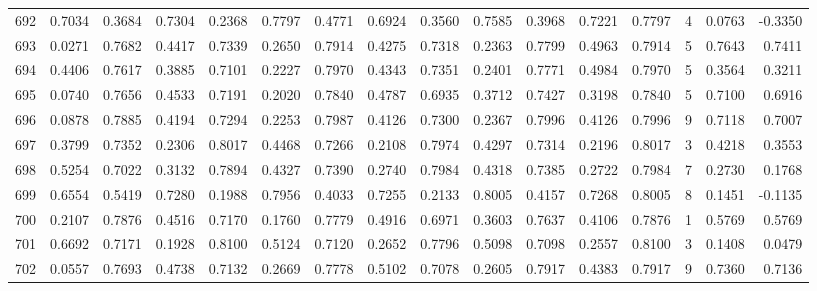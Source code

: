 \begin{tabular}{lrrrrrrrrrrrrrrr}
692 &      0.7034 &  0.3684 &  0.7304 &  0.2368 &  0.7797 &  0.4771 &  0.6924 &  0.3560 &  0.7585 &  0.3968 &   0.7221 &     0.7797 &      4 &                    0.0763 &                    -0.3350 \\
693 &      0.0271 &  0.7682 &  0.4417 &  0.7339 &  0.2650 &  0.7914 &  0.4275 &  0.7318 &  0.2363 &  0.7799 &   0.4963 &     0.7914 &      5 &                    0.7643 &                     0.7411 \\
694 &      0.4406 &  0.7617 &  0.3885 &  0.7101 &  0.2227 &  0.7970 &  0.4343 &  0.7351 &  0.2401 &  0.7771 &   0.4984 &     0.7970 &      5 &                    0.3564 &                     0.3211 \\
695 &      0.0740 &  0.7656 &  0.4533 &  0.7191 &  0.2020 &  0.7840 &  0.4787 &  0.6935 &  0.3712 &  0.7427 &   0.3198 &     0.7840 &      5 &                    0.7100 &                     0.6916 \\
696 &      0.0878 &  0.7885 &  0.4194 &  0.7294 &  0.2253 &  0.7987 &  0.4126 &  0.7300 &  0.2367 &  0.7996 &   0.4126 &     0.7996 &      9 &                    0.7118 &                     0.7007 \\
697 &      0.3799 &  0.7352 &  0.2306 &  0.8017 &  0.4468 &  0.7266 &  0.2108 &  0.7974 &  0.4297 &  0.7314 &   0.2196 &     0.8017 &      3 &                    0.4218 &                     0.3553 \\
698 &      0.5254 &  0.7022 &  0.3132 &  0.7894 &  0.4327 &  0.7390 &  0.2740 &  0.7984 &  0.4318 &  0.7385 &   0.2722 &     0.7984 &      7 &                    0.2730 &                     0.1768 \\
699 &      0.6554 &  0.5419 &  0.7280 &  0.1988 &  0.7956 &  0.4033 &  0.7255 &  0.2133 &  0.8005 &  0.4157 &   0.7268 &     0.8005 &      8 &                    0.1451 &                    -0.1135 \\
700 &      0.2107 &  0.7876 &  0.4516 &  0.7170 &  0.1760 &  0.7779 &  0.4916 &  0.6971 &  0.3603 &  0.7637 &   0.4106 &     0.7876 &      1 &                    0.5769 &                     0.5769 \\
701 &      0.6692 &  0.7171 &  0.1928 &  0.8100 &  0.5124 &  0.7120 &  0.2652 &  0.7796 &  0.5098 &  0.7098 &   0.2557 &     0.8100 &      3 &                    0.1408 &                     0.0479 \\
702 &      0.0557 &  0.7693 &  0.4738 &  0.7132 &  0.2669 &  0.7778 &  0.5102 &  0.7078 &  0.2605 &  0.7917 &   0.4383 &     0.7917 &      9 &                    0.7360 &                     0.7136 \\

\end{tabular}
